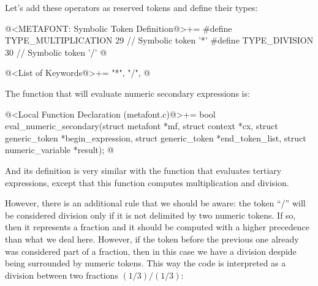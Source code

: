Let's add these operators as reserved tokens and define their types:

\iniciocodigo
@<METAFONT: Symbolic Token Definition@>+=
#define TYPE_MULTIPLICATION        29 // Symbolic token '*'
#define TYPE_DIVISION              30 // Symbolic token '/'
@
\fimcodigo

\iniciocodigo
@<List of Keywords@>+=
"*", "/",
@
\fimcodigo

The function that will evaluate numeric secondary expressions is:

\iniciocodigo
@<Local Function Declaration (metafont.c)@>+=
bool eval_numeric_secondary(struct metafont *mf, struct context *cx,
                             struct generic_token *begin_expression,
                             struct generic_token *end_token_list,
                             struct numeric_variable *result);
@
\fimcodigo

And its definition is very similar with the function that evaluates
tertiary expressions, except that this function computes
multiplication and division.

However, there is an additional rule that we should be aware: the
token ``/'' will be considered division only if it is not delimited by
two numeric tokens. If so, then it represents a fraction and it should
be computed with a higher precedence than what we deal here. However,
if the token before the previous one already was considered part of a
fraction, then in this case we have a division despide being
surrounded by numeric tokens. This way the code 
is interpreted as a division between two fractions $(1/3)/(1/3)$:

